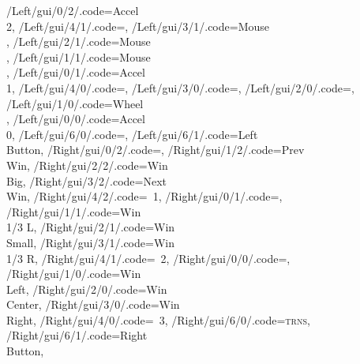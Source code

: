 \documentclass[]{article}
\begin{document}
{        /Left/gui/0/2/.code=Accel\\2,
    /Left/gui/4/1/.code=\shift,
        /Left/gui/3/1/.code=Mouse\\\arrowkeyleft,
        /Left/gui/2/1/.code=Mouse\\\arrowkeydown,
        /Left/gui/1/1/.code=Mouse\\\arrowkeyright,
        /Left/gui/0/1/.code=Accel\\1,
    /Left/gui/4/0/.code=,
        /Left/gui/3/0/.code=,
        /Left/gui/2/0/.code=,
        /Left/gui/1/0/.code=Wheel\\\arrowkeydown,
        /Left/gui/0/0/.code=Accel\\0,
    /Left/gui/6/0/.code=,
        /Left/gui/6/1/.code=Left\\Button,
%
    /Right/gui/0/2/.code=,
        /Right/gui/1/2/.code=Prev\\Win,
        /Right/gui/2/2/.code=Win\\Big,
        /Right/gui/3/2/.code=Next\\Win,
        /Right/gui/4/2/.code=\faBluetoothB~1,
    /Right/gui/0/1/.code=,
        /Right/gui/1/1/.code=Win\\1/3 L,
        /Right/gui/2/1/.code=Win\\Small,
        /Right/gui/3/1/.code=Win\\1/3 R,
        /Right/gui/4/1/.code=\faBluetoothB~2,
    /Right/gui/0/0/.code=,
        /Right/gui/1/0/.code=Win\\Left,
        /Right/gui/2/0/.code=Win\\Center,
        /Right/gui/3/0/.code=Win\\Right,
        /Right/gui/4/0/.code=\faBluetoothB~3,
    /Right/gui/6/0/.code=\textsc{trns},
        /Right/gui/6/1/.code=Right\\Button,
}
\end{document}
